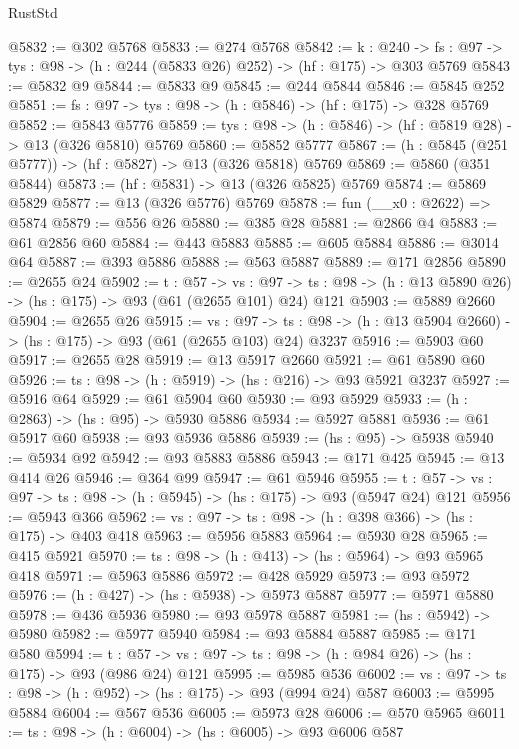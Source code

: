 \begin{lexlean}{RustStd}
\begin{coremodule}
@5832 := @302 @5768
@5833 := @274 @5768
@5842 := {k : @240} ->
  {fs : @97} -> {tys : @98} -> (h : @244 (@5833 @26) @252) -> (hf : @175) -> @303 @5769
@5843 := @5832 @9
@5844 := @5833 @9
@5845 := @244 @5844
@5846 := @5845 @252
@5851 := {fs : @97} -> {tys : @98} -> (h : @5846) -> (hf : @175) -> @328 @5769
@5852 := @5843 @5776
@5859 := {tys : @98} -> (h : @5846) -> (hf : @5819 @28) -> @13 (@326 @5810) @5769
@5860 := @5852 @5777
@5867 := (h : @5845 (@251 @5777)) -> (hf : @5827) -> @13 (@326 @5818) @5769
@5869 := @5860 (@351 @5844)
@5873 := (hf : @5831) -> @13 (@326 @5825) @5769
@5874 := @5869 @5829
@5877 := @13 (@326 @5776) @5769
@5878 := fun (__x0 : @2622) => @5874
@5879 := @556 @26
@5880 := @385 @28
@5881 := @2866 @4
@5883 := @61 @2856 @60
@5884 := @443 @5883
@5885 := @605 @5884
@5886 := @3014 @64
@5887 := @393 @5886
@5888 := @563 @5887
@5889 := @171 @2856
@5890 := @2655 @24
@5902 := {t : @57} ->
  {vs : @97} -> {ts : @98} -> (h : @13 @5890 @26) -> (hs : @175) -> @93 (@61 (@2655 @101) @24) @121
@5903 := @5889 @2660
@5904 := @2655 @26
@5915 := {vs : @97} ->
  {ts : @98} -> (h : @13 @5904 @2660) -> (hs : @175) -> @93 (@61 (@2655 @103) @24) @3237
@5916 := @5903 @60
@5917 := @2655 @28
@5919 := @13 @5917 @2660
@5921 := @61 @5890 @60
@5926 := {ts : @98} -> (h : @5919) -> (hs : @216) -> @93 @5921 @3237
@5927 := @5916 @64
@5929 := @61 @5904 @60
@5930 := @93 @5929
@5933 := (h : @2863) -> (hs : @95) -> @5930 @5886
@5934 := @5927 @5881
@5936 := @61 @5917 @60
@5938 := @93 @5936 @5886
@5939 := (hs : @95) -> @5938
@5940 := @5934 @92
@5942 := @93 @5883 @5886
@5943 := @171 @425
@5945 := @13 @414 @26
@5946 := @364 @99
@5947 := @61 @5946
@5955 := {t : @57} -> {vs : @97} -> {ts : @98} -> (h : @5945) -> (hs : @175) -> @93 (@5947 @24) @121
@5956 := @5943 @366
@5962 := {vs : @97} -> {ts : @98} -> (h : @398 @366) -> (hs : @175) -> @403 @418
@5963 := @5956 @5883
@5964 := @5930 @28
@5965 := @415 @5921
@5970 := {ts : @98} -> (h : @413) -> (hs : @5964) -> @93 @5965 @418
@5971 := @5963 @5886
@5972 := @428 @5929
@5973 := @93 @5972
@5976 := (h : @427) -> (hs : @5938) -> @5973 @5887
@5977 := @5971 @5880
@5978 := @436 @5936
@5980 := @93 @5978 @5887
@5981 := (hs : @5942) -> @5980
@5982 := @5977 @5940
@5984 := @93 @5884 @5887
@5985 := @171 @580
@5994 := {t : @57} ->
  {vs : @97} -> {ts : @98} -> (h : @984 @26) -> (hs : @175) -> @93 (@986 @24) @121
@5995 := @5985 @536
@6002 := {vs : @97} -> {ts : @98} -> (h : @952) -> (hs : @175) -> @93 (@994 @24) @587
@6003 := @5995 @5884
@6004 := @567 @536
@6005 := @5973 @28
@6006 := @570 @5965
@6011 := {ts : @98} -> (h : @6004) -> (hs : @6005) -> @93 @6006 @587

\end{coremodule}
\end{lexlean}
